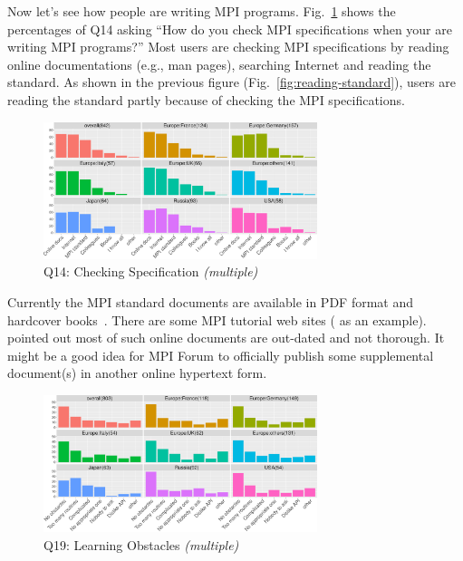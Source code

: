 \documentclass[conference,10pt,letterpaper]{IEEEtran}
\begin{document}
Now let's see how people are writing MPI
programs. Fig.~\ref{fig:checking-spec} shows the percentages of Q14
asking ``How do you check MPI specifications when your are writing MPI
programs?'' Most users are checking MPI specifications by reading online
documentations (e.g., man pages), searching Internet and reading the
standard. As shown in the previous figure
(Fig.~\ref{fig:reading-standard}), users are reading the standard
partly because of checking the MPI specifications.

\begin{figure}[htb]
\begin{center}
\includegraphics[width=8cm]{R-scripts/Q14.pdf}
\caption{Q14: Checking Specification {\it(multiple)}}
\label{fig:checking-spec}
\end{center}
\end{figure}

Currently the MPI standard documents are available in PDF format and
hardcover books~\cite{mpi-hardcover}. There are some MPI tutorial web
sites (\cite{mpi-tutorial} as an example). \cite{mpi-tutorial-intro}
pointed out most of such online documents are out-dated and not
thorough. It might be a good idea for MPI Forum to officially publish
some supplemental document(s) in another online hypertext form.

\begin{figure}[htb]
\begin{center}
\includegraphics[width=8cm]{R-scripts/Q19.pdf}
\caption{Q19: Learning Obstacles {\it(multiple)}}
\label{fig:learning-obstacles}
\end{center}
\end{figure}
\end{document}
